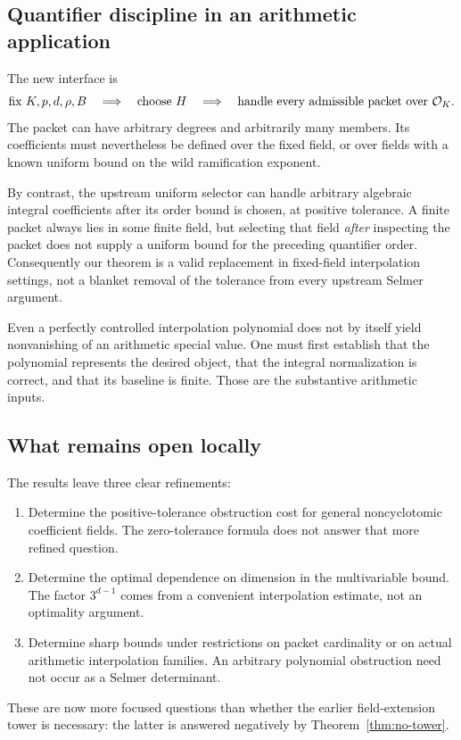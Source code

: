 \subsection{Quantifier discipline in an arithmetic application}
The new interface is
\[
 \text{fix }K,p,d,\rho,B
 \quad\Longrightarrow\quad
 \text{choose }H
 \quad\Longrightarrow\quad
 \text{handle every admissible packet over }\mathcal O_K.
\]
The packet can have arbitrary degrees and arbitrarily many members. Its coefficients must nevertheless be defined over the fixed field, or over fields with a known uniform bound on the wild ramification exponent.

By contrast, the upstream uniform selector can handle arbitrary algebraic integral coefficients after its order bound is chosen, at positive tolerance. A finite packet always lies in some finite field, but selecting that field \emph{after} inspecting the packet does not supply a uniform bound for the preceding quantifier order. Consequently our theorem is a valid replacement in fixed-field interpolation settings, not a blanket removal of the tolerance from every upstream Selmer argument.

Even a perfectly controlled interpolation polynomial does not by itself yield nonvanishing of an arithmetic special value. One must first establish that the polynomial represents the desired object, that the integral normalization is correct, and that its baseline is finite. Those are the substantive arithmetic inputs.

\subsection{What remains open locally}
The results leave three clear refinements:
\begin{enumerate}
\item Determine the positive-tolerance obstruction cost for general noncyclotomic coefficient fields. The zero-tolerance formula does not answer that more refined question.
\item Determine the optimal dependence on dimension in the multivariable bound. The factor $3^{d-1}$ comes from a convenient interpolation estimate, not an optimality argument.
\item Determine sharp bounds under restrictions on packet cardinality or on actual arithmetic interpolation families. An arbitrary polynomial obstruction need not occur as a Selmer determinant.
\end{enumerate}
These are now more focused questions than whether the earlier field-extension tower is necessary: the latter is answered negatively by Theorem~\ref{thm:no-tower}.

